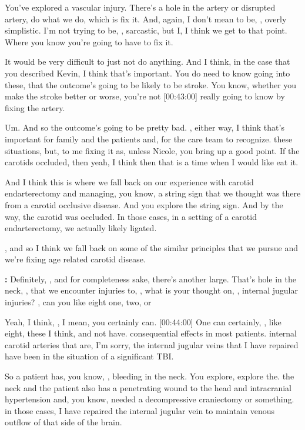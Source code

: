 \documentclass[
]{book}
\begin{document}
You've explored a vascular injury. There's a hole in the artery or
disrupted artery, do what we do, which is fix it. And, again, I
don't mean to be, , overly simplistic. I'm not trying to be, ,
sarcastic, but I, I think we get to that point. Where you know you're
going to have to fix it.

It would be very difficult to just not do anything. And I think, in
the case that you described Kevin, I think that's important. You do
need to know going into these, that the outcome's going to be likely to
be stroke. You know, whether you make the stroke better or worse,
you're not {[}00:43:00{]} really going to know by fixing the artery.

Um. And so the outcome's going to be pretty bad. , either way, I think
that's important for family and the patients and, for the care team to
recognize. these situations, but, to me fixing it as, unless
Nicole, you bring up a good point. If the carotids occluded, then yeah,
I think then that is a time when I would like eat it.

And I think this is where we fall back on our experience with carotid
endarterectomy and managing, you know, a string sign that we thought was
there from a carotid occlusive disease. And you explore the string sign.
And by the way, the carotid was occluded. In those cases, in a setting
of a carotid endarterectomy, we actually likely ligated.

, and so I think we fall back on some of the similar principles that we
pursue and we're fixing age related carotid disease.

\textbf{:} Definitely, , and
for completeness sake, there's another large. That's hole in the neck, ,
that we encounter injuries to, , what is your thought on, , internal
jugular injuries? , can you like eight one, two, or

Yeah, I
think, , I mean, you certainly can. {[}00:44:00{]} One can certainly, ,
like eight, these I think, and not have. consequential
effects in most patients. internal carotid arteries that are, I'm
sorry, the internal jugular veins that I have repaired have been in the
situation of a significant TBI.

So a patient has, you know, , bleeding in the neck. You explore,
explore the. the neck and the patient also has a penetrating wound to
the head and intracranial hypertension and, you know, needed a
decompressive craniectomy or something. in those cases, I have repaired
the internal jugular vein to maintain venous outflow of that side of the
brain.
\end{document}

